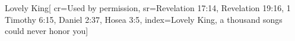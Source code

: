 {Lovely King}[
    cr={Used by permission},
    sr={Revelation 17:14, Revelation 19:16, 1 Timothy 6:15, Daniel 2:37, Hosea 3:5},
    index={Lovely King, a thousand songs could never honor you}]
